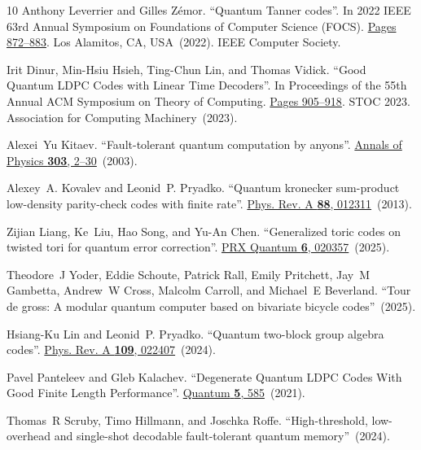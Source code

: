 \documentclass[a4paper,onecolumn,11pt]{quantumarticle}
\begin{document}
\begin{thebibliography}{10}
Anthony Leverrier and Gilles Z\'emor.
\newblock ``{Quantum Tanner codes}''.
\newblock In 2022 IEEE 63rd Annual Symposium on Foundations of Computer Science
  (FOCS).
\newblock \href{https://dx.doi.org/10.1109/FOCS54457.2022.00117}{Pages
  872--883}.
\newblock Los Alamitos, CA, USA~(2022). IEEE Computer Society.

Irit Dinur, Min-Hsiu Hsieh, Ting-Chun Lin, and Thomas Vidick.
\newblock ``{Good Quantum LDPC Codes with Linear Time Decoders}''.
\newblock In Proceedings of the 55th Annual ACM Symposium on Theory of
  Computing.
\newblock \href{https://dx.doi.org/10.1145/3564246.3585101}{Pages 905–918}.
\newblock STOC 2023. Association for Computing Machinery~(2023).

Alexei~Yu Kitaev.
\newblock ``Fault-tolerant quantum computation by anyons''.
\newblock \href{https://dx.doi.org/10.1016/S0003-4916(02)00018-0}{Annals of
  Physics {\bf 303}, 2--30}~(2003).

Alexey~A. Kovalev and Leonid~P. Pryadko.
\newblock ``Quantum kronecker sum-product low-density parity-check codes with
  finite rate''.
\newblock \href{https://dx.doi.org/10.1103/PhysRevA.88.012311}{Phys. Rev. A
  {\bf 88}, 012311}~(2013).

Zijian Liang, Ke~Liu, Hao Song, and Yu-An Chen.
\newblock ``Generalized toric codes on twisted tori for quantum error
  correction''.
\newblock \href{https://dx.doi.org/10.1103/rmy6-9n89}{PRX Quantum {\bf 6},
  020357}~(2025).

Theodore~J Yoder, Eddie Schoute, Patrick Rall, Emily Pritchett, Jay~M Gambetta,
  Andrew~W Cross, Malcolm Carroll, and Michael~E Beverland.
\newblock ``Tour de gross: A modular quantum computer based on bivariate
  bicycle codes''~(2025).

Hsiang-Ku Lin and Leonid~P. Pryadko.
\newblock ``Quantum two-block group algebra codes''.
\newblock \href{https://dx.doi.org/10.1103/PhysRevA.109.022407}{Phys. Rev. A
  {\bf 109}, 022407}~(2024).

Pavel Panteleev and Gleb Kalachev.
\newblock ``Degenerate {Q}uantum {LDPC} {C}odes {W}ith {G}ood {F}inite {L}ength
  {P}erformance''.
\newblock \href{https://dx.doi.org/10.22331/q-2021-11-22-585}{{Quantum} {\bf
  5}, 585}~(2021).

Thomas~R Scruby, Timo Hillmann, and Joschka Roffe.
\newblock ``High-threshold, low-overhead and single-shot decodable
  fault-tolerant quantum memory''~(2024).


\end{thebibliography}
\end{document}
